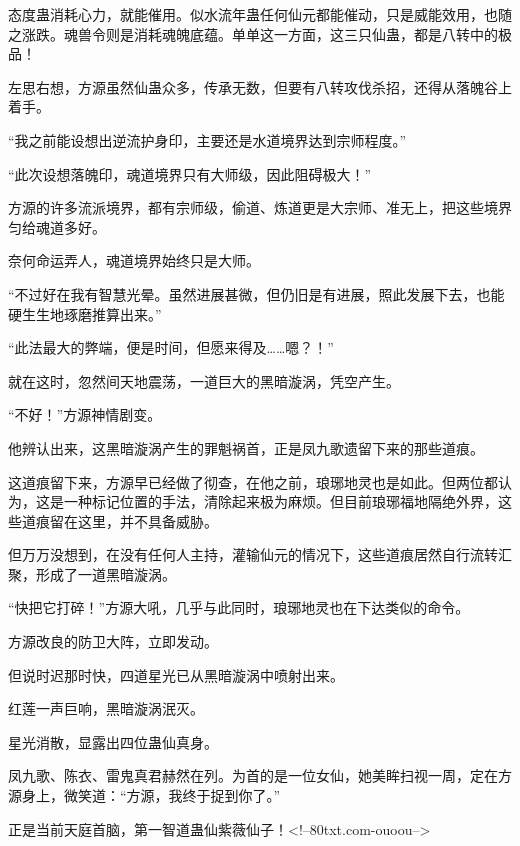 \begin{this_body}
态度蛊消耗心力，就能催用。似水流年蛊任何仙元都能催动，只是威能效用，也随之涨跌。魂兽令则是消耗魂魄底蕴。单单这一方面，这三只仙蛊，都是八转中的极品！

左思右想，方源虽然仙蛊众多，传承无数，但要有八转攻伐杀招，还得从落魄谷上着手。

“我之前能设想出逆流护身印，主要还是水道境界达到宗师程度。”

“此次设想落魄印，魂道境界只有大师级，因此阻碍极大！”

方源的许多流派境界，都有宗师级，偷道、炼道更是大宗师、准无上，把这些境界匀给魂道多好。

奈何命运弄人，魂道境界始终只是大师。

“不过好在我有智慧光晕。虽然进展甚微，但仍旧是有进展，照此发展下去，也能硬生生地琢磨推算出来。”

“此法最大的弊端，便是时间，但愿来得及……嗯？！”

就在这时，忽然间天地震荡，一道巨大的黑暗漩涡，凭空产生。

“不好！”方源神情剧变。

他辨认出来，这黑暗漩涡产生的罪魁祸首，正是凤九歌遗留下来的那些道痕。

这道痕留下来，方源早已经做了彻查，在他之前，琅琊地灵也是如此。但两位都认为，这是一种标记位置的手法，清除起来极为麻烦。但目前琅琊福地隔绝外界，这些道痕留在这里，并不具备威胁。

但万万没想到，在没有任何人主持，灌输仙元的情况下，这些道痕居然自行流转汇聚，形成了一道黑暗漩涡。

“快把它打碎！”方源大吼，几乎与此同时，琅琊地灵也在下达类似的命令。

方源改良的防卫大阵，立即发动。

但说时迟那时快，四道星光已从黑暗漩涡中喷射出来。

红莲一声巨响，黑暗漩涡泯灭。

星光消散，显露出四位蛊仙真身。

凤九歌、陈衣、雷鬼真君赫然在列。为首的是一位女仙，她美眸扫视一周，定在方源身上，微笑道：“方源，我终于捉到你了。”

正是当前天庭首脑，第一智道蛊仙紫薇仙子！<!--80txt.com-ouoou-->

\end{this_body}

